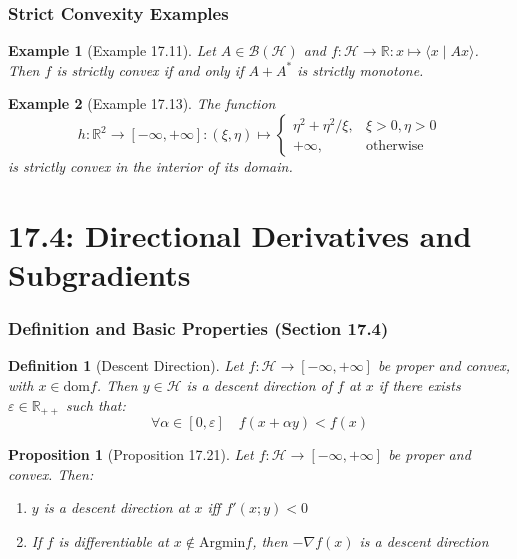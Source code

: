\documentclass[aspectratio=169,10pt]{beamer}
\newtheorem{prop}{Proposition}
\newtheorem{defn}{Definition}
\newtheorem{exmpl}{Example}
\begin{document}
\begin{frame}
  \frametitle{Strict Convexity Examples}

  \begin{exmpl}[Example 17.11]
    Let $A \in \mathcal{B}(\mathcal{H})$ and $f: \mathcal{H} \to \mathbb{R}: x \mapsto \langle x \mid Ax \rangle$. Then $f$ is strictly convex if and only if $A + A^*$ is strictly monotone.
  \end{exmpl}

  \begin{exmpl}[Example 17.13]
    The function
    \[
    h: \mathbb{R}^2 \to [-\infty, +\infty]: (\xi, \eta) \mapsto \begin{cases}
      \eta^2 + \eta^2/\xi, & \xi > 0, \eta > 0 \\
      +\infty, & \text{otherwise}
    \end{cases}
    \]
    is strictly convex in the interior of its domain.
  \end{exmpl}
\end{frame}

\section{17.4: Directional Derivatives and Subgradients}
\begin{frame}[fragile]
  \frametitle{Definition and Basic Properties (Section 17.4)}

  \begin{defn}[Descent Direction]
    Let $f: \mathcal{H} \to [-\infty, +\infty]$ be proper and convex, with $x \in \text{dom} f$. Then $y \in \mathcal{H}$ is a descent direction of $f$ at $x$ if there exists $\varepsilon \in \mathbb{R}_{++}$ such that:
    \[
    \forall \alpha \in [0, \varepsilon] \quad f(x + \alpha y) < f(x)
    \]
  \end{defn}

  \begin{prop}[Proposition 17.21]
    Let $f: \mathcal{H} \to [-\infty, +\infty]$ be proper and convex. Then:
    \begin{enumerate}
      \item[(i)] $y$ is a descent direction at $x$ iff $f'(x; y) < 0$
      \item[(ii)] If $f$ is differentiable at $x \notin \text{Argmin} f$, then $-\nabla f(x)$ is a descent direction
    \end{enumerate}
  \end{prop}
\end{frame}
\end{document}

